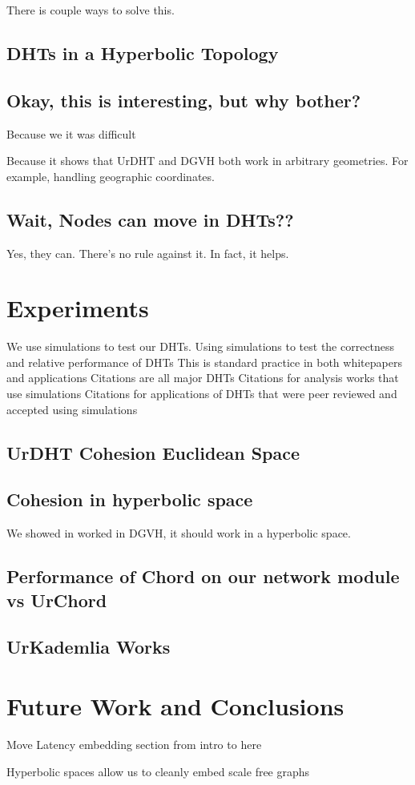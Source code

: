 \documentclass[11pt,conference]{IEEEtran}
\begin{document}
	There is couple ways to solve this.
	
	\subsection{DHTs in a Hyperbolic Topology}
	
	\label{sec:hyper}
	

	
	\subsection{Okay, this is interesting, but why bother?}
	Because we it was difficult
	
	Because it shows that UrDHT and DGVH both work in arbitrary geometries.
	For example, handling geographic coordinates. 
	
	
	\subsection{Wait, Nodes can move in DHTs??}
	Yes, they can.  
	There's no rule against it. 
	In fact, it helps.
	
	
	
	
\section{Experiments}
\label{sec:experiments}

We use simulations to test our DHTs.
Using simulations to test the correctness and relative performance of DHTs
This is standard practice in both whitepapers and applications
Citations are all major DHTs
Citations for analysis works that use simulations
Citations for applications of DHTs that were peer reviewed and accepted using simulations



\subsection{UrDHT Cohesion Euclidean Space}


\subsection{Cohesion in hyperbolic space}
We showed in worked in DGVH, it should work in a hyperbolic space.


\subsection{Performance of Chord on our network module vs UrChord}


\subsection{UrKademlia Works}


\section{Future Work and Conclusions}
\label{sec:future}

Move Latency embedding section from intro to here


Hyperbolic spaces allow us to cleanly embed scale free graphs



\end{document}
